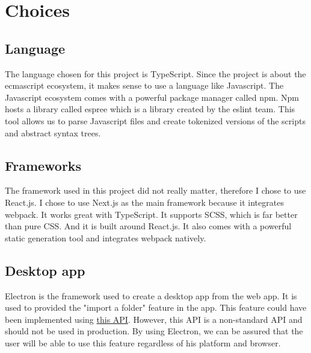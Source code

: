 \section{Choices}

\subsection{Language} 
The language chosen for this project is TypeScript. 
Since the project is about the ecmascript ecosystem, it makes sense to use a language like Javascript. 
The Javascript ecosystem comes with a powerful package manager called npm. 
Npm hosts a library called espree which is a library created by the eslint team. 
This tool allows us to parse Javascript files and create tokenized versions of the scripts and abstract syntax trees.

\subsection{Frameworks}
The framework used in this project did not really matter, 
therefore I chose to use React.js. 
I chose to use Next.js as the main framework because it integrates webpack. 
It works great with TypeScript. 
It supports SCSS, which is far better than pure CSS. And it is built around React.js.
It also comes with a powerful static generation tool and integrates webpack natively.

\subsection{Desktop app}
Electron is the framework used to create a desktop app from the web app. 
It is used to provided the "import a folder" feature in the app. 
This feature could have been implemented using 
\href{https://developer.mozilla.org/en-US/docs/Web/API/HTMLInputElement/webkitdirectory}{this API}. 
However, this API is a non-standard API and should not be used in production. 
By using Electron, we can be assured that the user will be able to use this feature regardless of his platform and browser.



